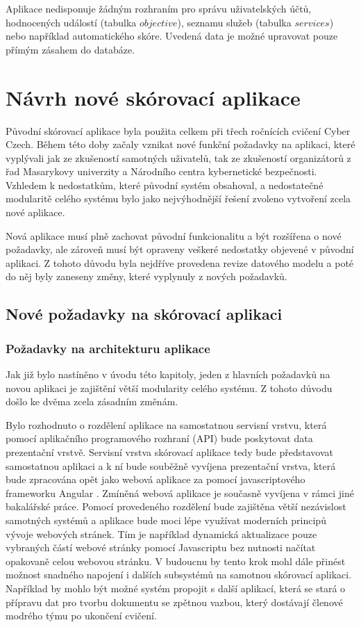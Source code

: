 \documentclass[
  digital,
  twoside,
  table, 
  nolof, 
  nolot
]{fithesis3}
\begin{document}
Aplikace nedisponuje žádným rozhraním pro správu uživatelských účtů, hodnocených událostí (tabulka $objective$), seznamu služeb (tabulka $services$) nebo například automatického skóre. Uvedená data je možné upravovat pouze přímým zásahem do databáze.

\chapter{Návrh nové skórovací aplikace}
\label{newApp}
Původní skórovací aplikace byla použita celkem při třech ročnících cvičení Cyber Czech. Během této doby začaly vznikat nové funkční požadavky na aplikaci, které vyplývali jak ze zkušeností samotných uživatelů, tak ze zkušeností organizátorů z řad Masarykovy univerzity a Národního centra kybernetické bezpečnosti. Vzhledem k nedostatkům, které původní systém obsahoval, a nedostatečné modularitě celého systému bylo jako nejvýhodnější řešení zvoleno vytvoření zcela nové aplikace. 

Nová aplikace musí plně zachovat původní funkcionalitu a být rozšířena o nové požadavky, ale zároveň musí být opraveny veškeré nedostatky objevené v původní aplikaci. Z tohoto důvodu byla nejdříve provedena revize datového modelu a poté do něj byly zaneseny změny, které vyplynuly z nových požadavků. 

\section{Nové požadavky na skórovací aplikaci}
\subsection{Požadavky na architekturu aplikace}

Jak již bylo nastíněno v úvodu této kapitoly, jeden z hlavních požadavků na novou aplikaci je zajištění větší modularity celého systému. Z tohoto důvodu došlo ke dvěma zcela zásadním změnám.

Bylo rozhodnuto o rozdělení aplikace na samostatnou servisní vrstvu, která pomocí aplikačního programového rozhraní (API) bude poskytovat data prezentační vrstvě. Servisní vrstva skórovací aplikace tedy bude představovat samostatnou aplikaci a k ní bude souběžně vyvíjena prezentační vrstva, která bude zpracována opět jako webová aplikace za pomocí javascriptového frameworku Angular \cite{angular}. Zmíněná webová aplikace je současně vyvíjena v rámci jiné bakalářské práce. Pomocí provedeného rozdělení bude zajištěna větší nezávislost samotných systémů a aplikace bude moci lépe využívat moderních principů vývoje webových stránek. Tím je například dynamická aktualizace pouze vybraných částí webové stránky pomocí Javascriptu bez nutnosti načítat opakovaně celou webovou stránku. V budoucnu by tento krok mohl dále přinést možnost  snadného napojení i dalších subsystémů na samotnou skórovací aplikaci. Například by mohlo být možné systém propojit s další aplikací, která se stará o přípravu dat pro tvorbu dokumentu se zpětnou vazbou, který dostávají členové modrého týmu po ukončení cvičení.
\end{document}
